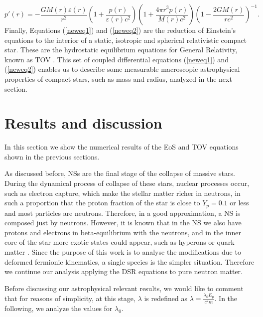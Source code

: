 \documentclass[final,5p,times,twocolumn]{elsarticle}
\begin{document}
\begin{equation}
        p'(r)
        = -\frac{GM(r)\varepsilon(r)}{r^{2}}\left(1+\frac{p(r)}{\varepsilon(r)c^2}\right) \left(1+\frac{4\pi r^{3} p(r)}{M(r)c^2} \right)\left(1-\frac{2GM(r)}{rc^2}\right)^{-1}.
     \label{neweq2}
\end{equation}
Finally, Equations (\ref{neweq1}) and (\ref{neweq2}) are the reduction of Einstein's equations to the interior of a static, isotropic and spherical relativistic compact star. These are the hydrostatic equilibrium equations for General Relativity, known as TOV \cite{tov1,tov2}. This set of coupled differential equations (\ref{neweq1}) and (\ref{neweq2}) enables us to describe some measurable macroscopic astrophysical properties of compact stars, such as mass and radius, analyzed in the next section. 

\section{Results and discussion}\label{results}

In this section we show the numerical results of the EoS and TOV equations shown in the previous sections. 

As discussed before, NSs are the final stage of the collapse of massive stars. During the dynamical process of collapse of these stars, nuclear processes occur, such as electron capture, which make the stellar matter richer in neutrons, in such a proportion that the proton fraction of the star is close to $Y_p = 0.1$ or less \cite{Glendenning1997} and most particles are neutrons. Therefore, in a good approximation, a NS is composed just by neutrons. However, it is known that in the NS we also have protons and electrons in beta-equilibrium with the neutrons, and in the inner core of the star more exotic states could appear, such as hyperons or quark matter \cite{Glendenning1997}. 
Since the purpose of this work is to analyse the modifications due to deformed fermionic kinematics, a single species is the simpler situation. Therefore we continue our analysis applying the DSR equations to pure neutron matter.

Before discussing our astrophysical relevant results, we would like to comment that for  reasons of simplicity, at this stage, $\lambda$  is  redefined as $\lambda = \frac{\lambda_0 E_{p}}{c^2 m}$. In the following, we analyze the values for $\lambda_0$.
\end{document}
